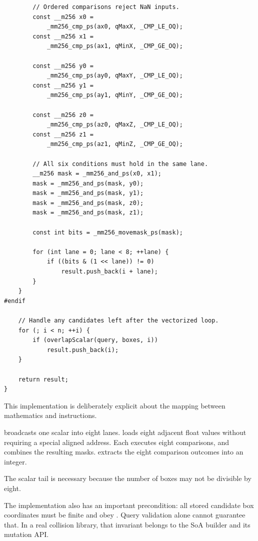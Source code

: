 \begin{verbatim}
        // Ordered comparisons reject NaN inputs.
        const __m256 x0 =
            _mm256_cmp_ps(ax0, qMaxX, _CMP_LE_OQ);
        const __m256 x1 =
            _mm256_cmp_ps(ax1, qMinX, _CMP_GE_OQ);

        const __m256 y0 =
            _mm256_cmp_ps(ay0, qMaxY, _CMP_LE_OQ);
        const __m256 y1 =
            _mm256_cmp_ps(ay1, qMinY, _CMP_GE_OQ);

        const __m256 z0 =
            _mm256_cmp_ps(az0, qMaxZ, _CMP_LE_OQ);
        const __m256 z1 =
            _mm256_cmp_ps(az1, qMinZ, _CMP_GE_OQ);

        // All six conditions must hold in the same lane.
        __m256 mask = _mm256_and_ps(x0, x1);
        mask = _mm256_and_ps(mask, y0);
        mask = _mm256_and_ps(mask, y1);
        mask = _mm256_and_ps(mask, z0);
        mask = _mm256_and_ps(mask, z1);

        const int bits = _mm256_movemask_ps(mask);

        for (int lane = 0; lane < 8; ++lane) {
            if ((bits & (1 << lane)) != 0)
                result.push_back(i + lane);
        }
    }
#endif

    // Handle any candidates left after the vectorized loop.
    for (; i < n; ++i) {
        if (overlapScalar(query, boxes, i))
            result.push_back(i);
    }

    return result;
}
\end{verbatim}

This implementation is deliberately explicit about the mapping between mathematics and instructions.

 broadcasts one scalar into eight lanes.  loads eight adjacent float values without requiring a special aligned address. Each  executes eight comparisons, and  combines the resulting masks.  extracts the eight comparison outcomes into an integer.

The scalar tail is necessary because the number of boxes may not be divisible by eight.

The implementation also has an important precondition: all stored candidate box coordinates must be finite and obey . Query validation alone cannot guarantee that. In a real collision library, that invariant belongs to the SoA builder and its mutation API.

